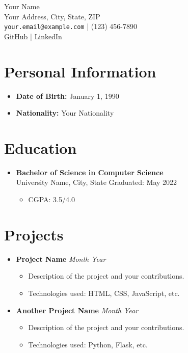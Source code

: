 \documentclass[a4paper,11pt]{article}
\begin{document}
  
  \begin{center}
      {\LARGE Your Name} \\[0.5em]
      Your Address, City, State, ZIP \\[0.5em]
      \texttt{your.email@example.com} | (123) 456-7890 \\[0.5em]
      \href{https://github.com/yourusername}{GitHub} | \href{https://linkedin.com/in/yourusername}{LinkedIn}
  \end{center}
  
  \section*{Personal Information}
  \begin{itemize}[leftmargin=0.5cm]
      \item \textbf{Date of Birth:} January 1, 1990
      \item \textbf{Nationality:} Your Nationality
  \end{itemize}
  
  \section*{Education}
  \begin{itemize}[leftmargin=0.5cm]
      \item \textbf{Bachelor of Science in Computer Science} \\
      University Name, City, State \hfill Graduated: May 2022
      \begin{itemize}
          \item CGPA: 3.5/4.0
      \end{itemize}
  \end{itemize}
  
  \section*{Projects}
  \begin{itemize}[leftmargin=0.5cm]
      \item \textbf{Project Name} \hfill \textit{Month Year}
      \begin{itemize}
          \item Description of the project and your contributions.
          \item Technologies used: HTML, CSS, JavaScript, etc.
      \end{itemize}
  
      \item \textbf{Another Project Name} \hfill \textit{Month Year}
      \begin{itemize}
          \item Description of the project and your contributions.
          \item Technologies used: Python, Flask, etc.
      \end{itemize}
  \end{itemize}
  
\end{document}
